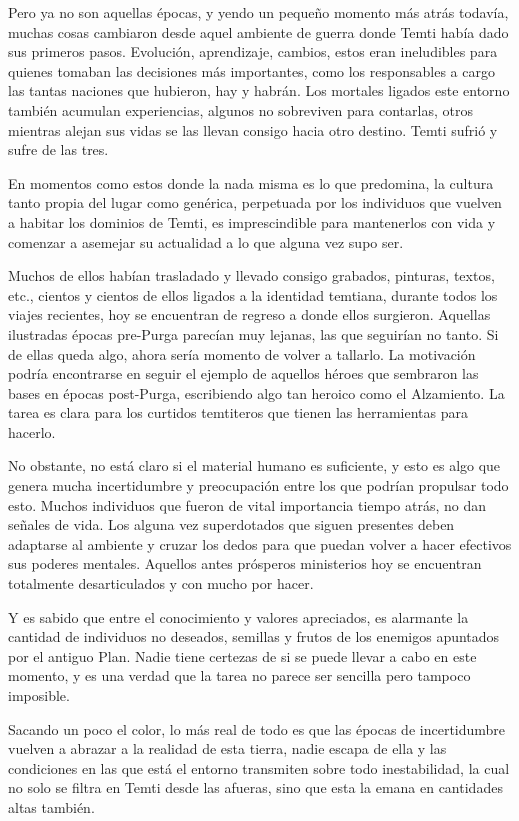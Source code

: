 \documentclass[
  spanish,
]{book}
\begin{document}
Pero ya no son aquellas épocas, y yendo un pequeño momento más atrás todavía, muchas cosas cambiaron desde aquel ambiente de guerra donde Temti había dado sus primeros pasos. Evolución, aprendizaje, cambios, estos eran ineludibles para quienes tomaban las decisiones más importantes, como los responsables a cargo las tantas naciones que hubieron, hay y habrán. Los mortales ligados este entorno también acumulan experiencias, algunos no sobreviven para contarlas, otros mientras alejan sus vidas se las llevan consigo hacia otro destino. Temti sufrió y sufre de las tres.

En momentos como estos donde la nada misma es lo que predomina, la cultura tanto propia del lugar como genérica, perpetuada por los individuos que vuelven a habitar los dominios de Temti, es imprescindible para mantenerlos con vida y comenzar a asemejar su actualidad a lo que alguna vez supo ser.

Muchos de ellos habían trasladado y llevado consigo grabados, pinturas, textos, etc., cientos y cientos de ellos ligados a la identidad temtiana, durante todos los viajes recientes, hoy se encuentran de regreso a donde ellos surgieron. Aquellas ilustradas épocas pre-Purga parecían muy lejanas, las que seguirían no tanto. Si de ellas queda algo, ahora sería momento de volver a tallarlo. La motivación podría encontrarse en seguir el ejemplo de aquellos héroes que sembraron las bases en épocas post-Purga, escribiendo algo tan heroico como el Alzamiento. La tarea es clara para los curtidos temtiteros que tienen las herramientas para hacerlo.

No obstante, no está claro si el material humano es suficiente, y esto es algo que genera mucha incertidumbre y preocupación entre los que podrían propulsar todo esto. Muchos individuos que fueron de vital importancia tiempo atrás, no dan señales de vida. Los alguna vez superdotados que siguen presentes deben adaptarse al ambiente y cruzar los dedos para que puedan volver a hacer efectivos sus poderes mentales. Aquellos antes prósperos ministerios hoy se encuentran totalmente desarticulados y con mucho por hacer.

Y es sabido que entre el conocimiento y valores apreciados, es alarmante la cantidad de individuos no deseados, semillas y frutos de los enemigos apuntados por el antiguo Plan. Nadie tiene certezas de si se puede llevar a cabo en este momento, y es una verdad que la tarea no parece ser sencilla pero tampoco imposible.

Sacando un poco el color, lo más real de todo es que las épocas de incertidumbre vuelven a abrazar a la realidad de esta tierra, nadie escapa de ella y las condiciones en las que está el entorno transmiten sobre todo inestabilidad, la cual no solo se filtra en Temti desde las afueras, sino que esta la emana en cantidades altas también.
\end{document}
